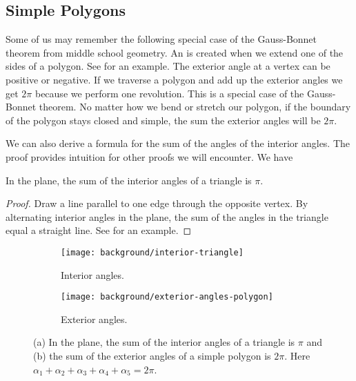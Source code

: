 \subsection{Simple Polygons}
\label{sec:warm-up}

Some of us may remember the following special case
of the Gauss-Bonnet theorem from middle school geometry.
An  is created when we extend one of the sides of a polygon.
See  for an example.
The exterior angle at a vertex can be positive or negative.
If we traverse a polygon and add up the exterior angles
we get $2\pi$ because we perform one revolution.
This is a special case of the Gauss-Bonnet theorem.
No matter how we bend or stretch our polygon,
if the boundary of the polygon stays closed and simple,
the sum the exterior angles will be $2\pi$.

We can also derive a formula for the sum of the angles
of the interior angles.
The proof provides intuition for other proofs we will encounter.
We have
\begin{theorem}\label{thm:triangle}
In the plane, the sum of the interior angles of a triangle is $\pi$.
\end{theorem}
\begin{proof}
Draw a line parallel to one edge through the opposite vertex.
By alternating interior angles in the plane, the sum of the angles
in the triangle equal a straight line.
See  for an example. 
\end{proof}


 \begin{figure}[htb]
         \centering
        \begin{subfigure}[b]{0.35\textwidth}
         \texttt{[image: background/interior-triangle]}
         \caption{Interior angles.}
 	 \label{fig:interior-angles}
       \end{subfigure}
         \hspace{1cm}
         \begin{subfigure}[b]{0.25\textwidth}
         \texttt{[image: background/exterior-angles-polygon]}
         \caption{Exterior angles.}
          \label{fig:exterior-angles}
         \end{subfigure}
		\caption{(a) In the plane, the sum of the interior angles of a triangle is $\pi$
 		and (b) the sum of the exterior angles of a simple
		polygon is $2\pi$. Here
		$\alpha_1+\alpha_2+\alpha_3+\alpha_4+\alpha_5=2\pi$.
 		\label{fig:simple-polygon}}
 \end{figure}

